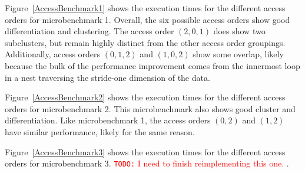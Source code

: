 \documentclass[sigconf, table]{acmart}
\newcommand{\todo}[1]{{\textcolor{red}{{\tt{TODO:}}\,\,#1 }}}
\begin{document}
Figure~\ref{AccessBenchmark1} shows the execution times for the different access orders for microbenchmark 1.
Overall, the six possible access orders show good differentiation and clustering.
The access order $(2,0,1)$ does show two subclusters, but remain highly distinct from the other access order groupings. 
Additionally, access orders $(0,1,2)$ and $(1,0,2)$ show some overlap, likely because the bulk of the performance improvement comes from the innermost loop in a nest traversing the stride-one dimension of the data.

Figure~\ref{AccessBenchmark2} shows the execution times for the different access orders for microbenchmark 2. 
This microbenchmark also shows good cluster and differentiation.
Like microbenchmark 1, the access orders $(0,2)$ and $(1,2)$ have similar performance, likely for the same reason. 

Figure~\ref{AccessBenchmark3} shows the execution times for the different access orders for microbenchmark 3.
\todo{I need to finish reimplementing this one.}.

\end{document}
